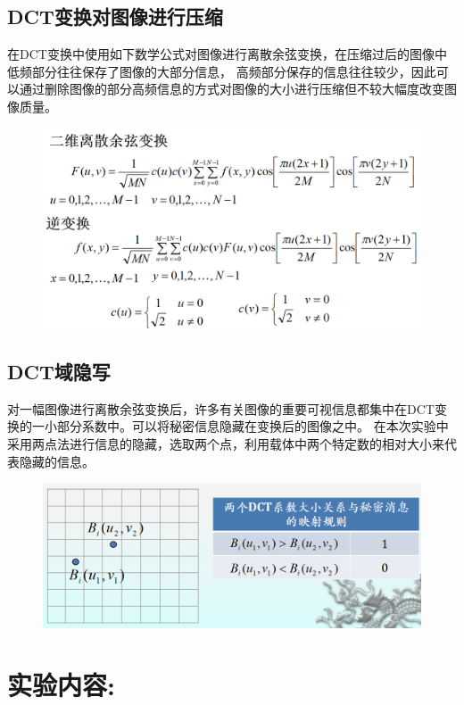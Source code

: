 \documentclass[a4paper,11pt,UTF8]{ctexart}
\newcommand{\bottomcaption}{%
\setlength{\abovecaptionskip}{6pt}%
\setlength{\belowcaptionskip}{6pt}%
\caption}
\newcommand{\xiaowuhao}{\fontsize{9pt}{\baselineskip}\selectfont}   %
\begin{document}
  \subsection{DCT变换对图像进行压缩}
    在DCT变换中使用如下数学公式对图像进行离散余弦变换，在压缩过后的图像中低频部分往往保存了图像的大部分信息，
    高频部分保存的信息往往较少，因此可以通过删除图像的部分高频信息的方式对图像的大小进行压缩但不较大幅度改变图像质量。
    \begin{figure}[!htbp]
    \centering
    \includegraphics[width=\textwidth]{DCT_math.png}
    \bottomcaption{\xiaowuhao{DCT压缩原理}}
    \end{figure}

  \subsection{DCT域隐写}
  对一幅图像进行离散余弦变换后，许多有关图像的重要可视信息都集中在DCT变换的一小部分系数中。可以将秘密信息隐藏在变换后的图像之中。
  在本次实验中采用两点法进行信息的隐藏，选取两个点，利用载体中两个特定数的相对大小来代表隐藏的信息。
  \begin{figure}[!htbp]
  \centering
  \includegraphics[width=\textwidth]{DCT.png}
  \bottomcaption{\xiaowuhao{DCT隐写原理}}
  \end{figure}

\section{实验内容:}
\end{document}
